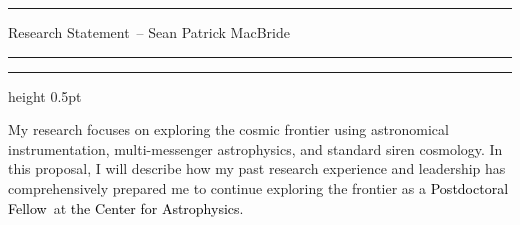 \documentclass[11pt]{article}
\newcommand{\tcolor}{black}
\newcommand{\yourname}{Sean Patrick MacBride}
\newcommand{\soptitle}{Research Statement}
\newcommand{\Institute}{\textcolor{\tcolor}{ the Center for Astrophysics}}
\newcommand{\Position}{\textcolor{\tcolor}{Postdoctoral Fellow}}
\begin{document}
\hrule
\begin{center}
    \Large\soptitle\ -- \yourname
\end{center}
\vspace{0pt}
\hrule
\vspace{0.5pt}
\hrule height 0.5pt
\vspace{3pt}

\normalsize
\noindent My research focuses on exploring the cosmic frontier using astronomical instrumentation, multi-messenger astrophysics, and standard siren cosmology.
In this proposal, I will describe how my past research experience and leadership has comprehensively prepared me to continue exploring the frontier as a \Position\ at \Institute.

  
\end{document}
